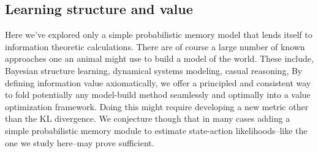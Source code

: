 \documentclass[9pt,twocolumn,twoside]{pnas-new}
\begin{document}
\subsection*{Learning structure and value}
Here we've explored only a simple probabilistic memory model that lends itself to information theoretic calculations. There are of course a large number of known approaches one an animal might use to build a model of the world. These include, Bayesian structure learning, dynamical systems modeling, casual reasoning, %
By defining information value axiomatically, we offer a principled and consistent way to fold potentially any model-build method seamlessly and optimally into a value optimization framework. Doing this might require developing a new metric other than the KL divergence. We conjecture though that in many cases adding a simple probabilistic memory module to estimate state-action likelihoods--like the one we study here--may prove sufficient.


\end{document}
